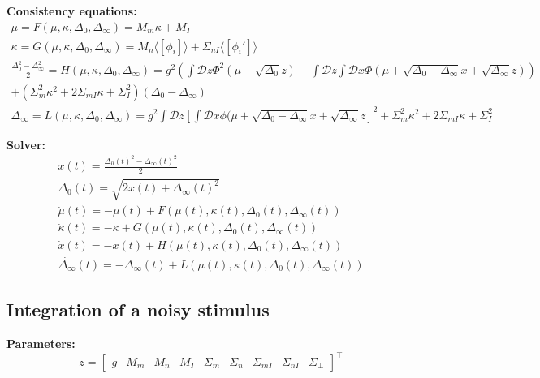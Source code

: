 \documentclass[11pt]{article}
\begin{document}
\textbf{Consistency equations:} \\ 
\begin{equation}
\begin{split}
\mu = F(\mu, \kappa, \Delta_0, \Delta_\infty) = M_m \kappa + M_I \\
\kappa = G(\mu, \kappa, \Delta_0, \Delta_\infty) = M_n \langle \left[ \phi_i \right] \rangle + \Sigma_{nI} \langle \left[ \phi_i' \right] \rangle \\
\frac{\Delta_0^2-\Delta_\infty^2}{2} = H(\mu, \kappa, \Delta_0, \Delta_\infty) = g^2 \left( \int \mathcal{D}z \Phi^2(\mu + \sqrt{\Delta_0}z) - \int \mathcal{D}z \int \mathcal{D}x \Phi(\mu + \sqrt{\Delta_0 - \Delta_\infty}x + \sqrt{\Delta_\infty}z)  \right) \\
+ (\Sigma_m^2 \kappa^2 + 2\Sigma_{mI} \kappa + \Sigma_I^2)(\Delta_0-\Delta_\infty) \\
\Delta_\infty = L(\mu, \kappa, \Delta_0, \Delta_\infty)  = g^2 \int \mathcal{D}z \left[ \int \mathcal{D}x \phi(\mu + \sqrt{\Delta_0 - \Delta_\infty}x + \sqrt{\Delta_\infty}z \right]^2 + \Sigma_m^2 \kappa^2 + 2\Sigma_{mI} \kappa + \Sigma_I^2
\end{split} 
\end{equation}

\textbf{Solver:}
\begin{equation}
\begin{split}
x(t) = \frac{\Delta_0(t)^2-\Delta_\infty(t)^2}{2} \\
\Delta_0(t) = \sqrt{2x(t) + \Delta_\infty(t)^2} \\
\dot{\mu}(t) = -\mu(t) + F(\mu(t), \kappa(t), \Delta_0(t), \Delta_\infty(t)) \\
\dot{\kappa}(t) = -\kappa + G(\mu(t), \kappa(t), \Delta_0(t), \Delta_\infty(t)) \\
\dot{x}(t) = -x(t) + H(\mu(t), \kappa(t), \Delta_0(t), \Delta_\infty(t)) \\
\dot{\Delta_\infty}(t) = -\Delta_\infty(t) + L(\mu(t), \kappa(t), \Delta_0(t), \Delta_\infty(t))
\end{split}
\end{equation}


\subsection{Integration of a noisy stimulus}
\textbf{Parameters:} \\
\[z = \begin{bmatrix} g & M_m & M_n & M_I & \Sigma_m & \Sigma_n & \Sigma_{mI} & \Sigma_{nI} & \Sigma_\perp \end{bmatrix}^\top \]
\end{document}
